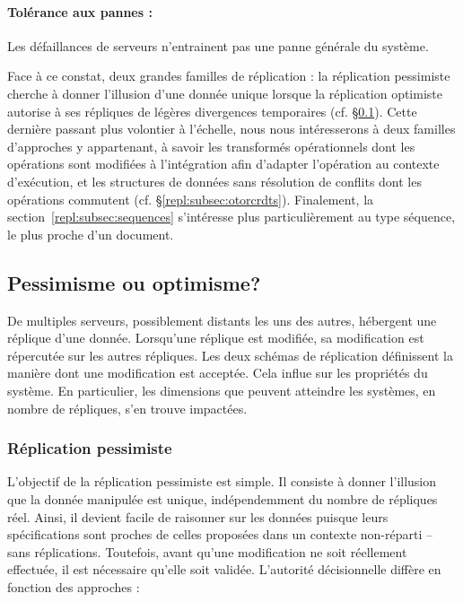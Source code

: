 \paragraph{Tolérance aux pannes :} Les défaillances de serveurs n'entrainent pas
une panne générale du système.

Face à ce constat, deux grandes familles de réplication : la réplication
pessimiste cherche à donner l'illusion d'une donnée unique lorsque la
réplication optimiste autorise à ses répliques de légères divergences
temporaires (cf. §\ref{repl:subsec:schemas}). Cette dernière passant plus
volontier à l'échelle, nous nous intéresserons à deux familles d'approches y
appartenant, à savoir les transformés opérationnels dont les opérations sont
modifiées à l'intégration afin d'adapter l'opération au contexte d'exécution, et
les structures de données sans résolution de conflits dont les opérations
commutent (cf. §\ref{repl:subsec:otorcrdts}). Finalement, la
section~\ref{repl:subsec:sequences} s'intéresse plus particulièrement au type
séquence, le plus proche d'un document.


\subsection{Pessimisme ou optimisme?}
\label{repl:subsec:schemas}

De multiples serveurs, possiblement distants les uns des autres, hébergent une
réplique d'une donnée. Lorsqu'une réplique est modifiée, sa modification est
répercutée sur les autres répliques. Les deux schémas de réplication définissent
la manière dont une modification est acceptée. Cela influe sur les propriétés du
système. En particulier, les dimensions que peuvent atteindre les systèmes, en
nombre de répliques, s'en trouve impactées.

\subsubsection{Réplication pessimiste}
\label{repl:subsubsec:pessimistic}

L'objectif de la réplication pessimiste est simple. Il consiste à donner
l'illusion que la donnée manipulée est unique, indépendemment du nombre de
répliques réel. Ainsi, il devient facile de raisonner sur les données puisque
leurs spécifications sont proches de celles proposées dans un contexte
non-réparti -- sans réplications.  Toutefois, avant qu'une modification ne soit
réellement effectuée, il est nécessaire qu'elle soit validée. L'autorité
décisionnelle diffère en fonction des approches :

